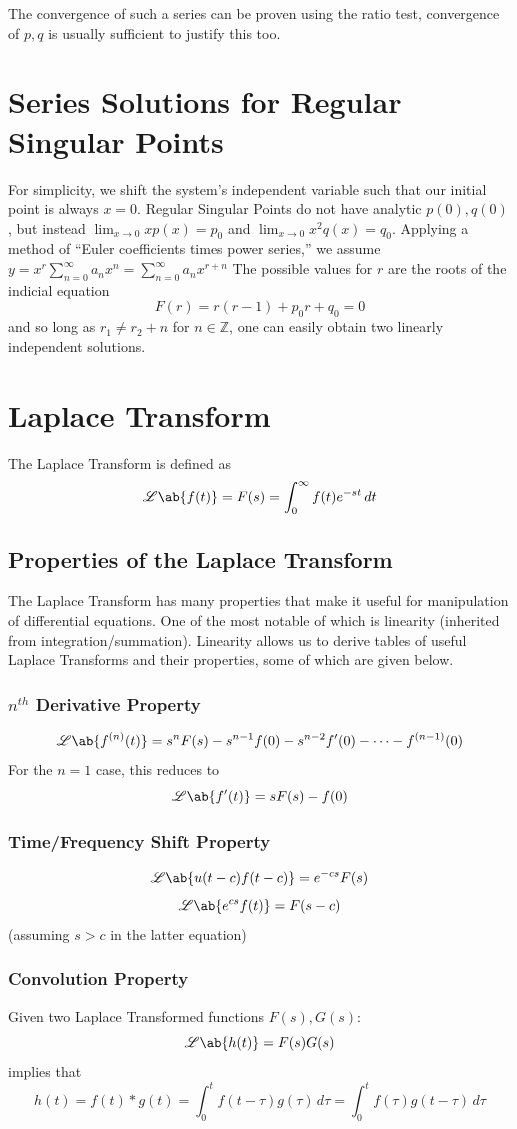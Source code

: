 \documentclass{article}
\newcommand{\lablace}[1]{\mathscr{L}\ab\{#1\}}
\begin{document}
The convergence of such a series can be proven using the ratio test, convergence of $p,q$ is usually sufficient to justify this too.

\section{Series Solutions for Regular Singular Points}
For simplicity, we shift the system's independent variable such that our initial point is always $x=0$.
Regular Singular Points do not have analytic $p(0),q(0)$, but instead $\lim_{x\to0}xp(x)=p_0$ and $\lim_{x\to0}x^2q(x)=q_0$. Applying a method of ``Euler coefficients times power series,'' we assume
$y=x^r\sum_{n=0}^\infty a_nx^n= \sum_{n=0}^\infty a_nx^{r+n}$
The possible values for $r$ are the roots of the indicial equation
$$F(r)=r(r-1)+p_0r+q_0=0$$
and so long as $r_1\ne r_2+n$ for $n\in\mathbb{Z}$, one can easily obtain two linearly independent solutions.

\section{Laplace Transform}
The Laplace Transform is defined as
$$\mathscr{L}\ab\{f(t)\}=F(s)=\int_0^\infty f(t)e^{-st}\,dt$$
\subsection{Properties of the Laplace Transform}
The Laplace Transform has many properties that make it useful for manipulation  of differential equations. One of the most notable of which is linearity (inherited from integration/summation). Linearity allows us to derive tables of useful Laplace Transforms and their properties, some of which are given below.
\subsubsection{$n^{th}$ Derivative Property}
$$\lablace{f^{(n)}(t)}=s^nF(s)-s^{n-1}f(0)-s^{n-2}f'(0)-\cdots-f^{(n-1)}(0)$$
For the $n=1$ case, this reduces to
$$\lablace{f'(t)}=sF(s)-f(0)$$
\subsubsection{Time/Frequency Shift Property}
$$\lablace{u(t-c)f(t-c)}=e^{-cs}F(s)$$
$$\lablace{e^{cs}f(t)}=F(s-c)$$
(assuming $s>c$ in the latter equation)
\subsubsection{Convolution Property}
Given two Laplace Transformed functions $F(s),G(s)$:
$$\lablace{h(t)}=F(s)G(s)$$ implies that $$h(t)=f(t)*g(t)=\int_0^tf(t-\tau)g(\tau)\,d\tau=\int_0^tf(\tau)g(t-\tau)\,d\tau$$
\end{document}
